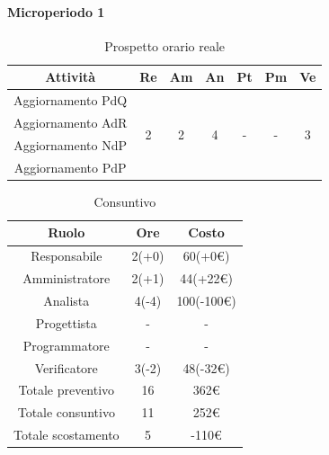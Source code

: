 \paragraph{Microperiodo 1}
\begin{table}[H]
	\centering
	\begin{tabular}{|c|c|c|c|c|c|c|}
		\hline
		\rowcolor{lighter-grayer}
		\textbf{Attività} & \textbf{Re}        & \textbf{Am}        & \textbf{An}        & \textbf{Pt}        & \textbf{Pm}        & \textbf{Ve}        \\ \hline
		Aggiornamento PdQ & \multirow{4}{*}{2} & \multirow{4}{*}{2} & \multirow{4}{*}{4} & \multirow{4}{*}{-} & \multirow{4}{*}{-} & \multirow{4}{*}{3} \\ \cline{1-1}
		Aggiornamento AdR &                    &                    &                    &                    &                    &                    \\ \cline{1-1}
		Aggiornamento NdP &                    &                    &                    &                    &                    &                    \\ \cline{1-1}
		Aggiornamento PdP &                    &                    &                    &                    &                    &                    \\ \hline
	\end{tabular}
	\caption{ Prospetto orario reale\\}
\end{table}

\begin{table}[H]
	\centering
	\renewcommand{\arraystretch}{1.5}
	\begin{tabular}{|c|c|c|}
		\hline
		\rowcolor{lighter-grayer}
		Ruolo & Ore & Costo \\ \hline
		Responsabile & 2(+0) & 60(+0\euro) \\ \hline
		Amministratore & 2(+1) & 44(+22\euro) \\ \hline
		Analista & 4(-4) & 100(-100\euro) \\ \hline
		Progettista & - & - \\ \hline
		Programmatore & - & - \\ \hline
		Verificatore & 3(-2) & 48(-32\euro) \\ \hline
		Totale preventivo & 16 & 362\euro \\ \hline
		Totale consuntivo & 11 & 252\euro \\ \hline
		Totale scostamento & 5 & -110\euro \\ \hline
	\end{tabular}
	\caption{ Consuntivo\\}
\end{table}

